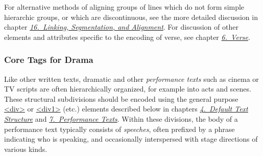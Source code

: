 For alternative methods of aligning groups of lines which do not form simple hierarchic groups, or which are discontinuous, see the more detailed discussion in chapter \textit{\hyperref[SA]{16.\ Linking, Segmentation, and Alignment}}. For discussion of other elements and attributes specific to the encoding of verse, see chapter \textit{\hyperref[VE]{6.\ Verse}}.
\subsubsection[{Core Tags for Drama}]{Core Tags for Drama}\label{CODR}\par
Like other written texts, dramatic and other \textit{performance texts} such as cinema or TV scripts are often hierarchically organized, for example into acts and scenes. These structural subdivisions should be encoded using the general purpose \hyperref[TEI.div]{<div>} or \hyperref[TEI.div1]{<div1>} (etc.) elements described below in chapters \textit{\hyperref[DS]{4.\ Default Text Structure}} and \textit{\hyperref[DR]{7.\ Performance Texts}}. Within these divisions, the body of a performance text typically consists of \textit{speeches}, often prefixed by a phrase indicating who is speaking, and occasionally interspersed with stage directions of various kinds.\par
